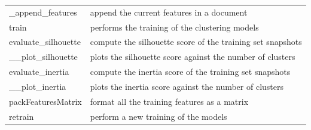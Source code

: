 \begin{longtable}{p{}p{}}
    \_append\_features & append the current features in a document \\
    train & performs the training of the clustering models \\
    evaluate\_silhouette & compute the silhouette score of the training set snapshots \\
    \_\_plot\_silhouette & plots the silhouette score against the number of clusters \\
    evaluate\_inertia & compute the inertia score of the training set snapshots \\
    \_\_plot\_inertia & plots the inertia score against the number of clusters \\
    packFeaturesMatrix & format all the training features as a matrix \\
    retrain & perform a new training of the models \\
    \bottomrule
    \end{longtable}
    
\newpage
